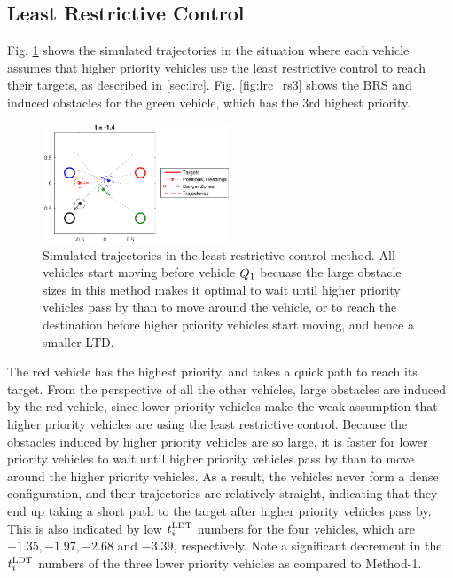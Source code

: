 \subsection{Least Restrictive Control}
Fig. \ref{fig:lrc_traj} shows the simulated trajectories in the situation where each vehicle assumes that higher priority vehicles use the least restrictive control to reach their targets, as described in \ref{sec:lrc}. Fig. \ref{fig:lrc_rs3} shows the BRS and induced obstacles for the green vehicle, which has the 3rd highest priority.

\begin{figure}
  \centering
  \includegraphics[width=0.5\textwidth]{"fig/lrc_traj"}
  \caption{Simulated trajectories in the least restrictive control method. All vehicles start moving before vehicle $Q_1$ becuase the large obstacle sizes in this method makes it optimal to wait until higher priority vehicles pass by than to move around the vehicle, or to reach the destination before higher priority vehicles start moving, and hence a smaller LTD. }
  \label{fig:lrc_traj}
\end{figure}

The red vehicle has the highest priority, and takes a quick path to reach its target. From the perspective of all the other vehicles, large obstacles are induced by the red vehicle, since lower priority vehicles make the weak assumption that higher priority vehicles are using the least restrictive control. Because the obstacles induced by higher priority vehicles are so large, it is faster for lower priority vehicles to wait until higher priority vehicles pass by than to move around the higher priority vehicles. As a result, the vehicles never form a dense configuration, and their trajectories are relatively straight, indicating that they end up taking a short path to the target after higher priority vehicles pass by. This is also indicated by low $t^\text{LDT}_i$ numbers for the four vehicles, which are $-1.35, -1.97, -2.68$ and $-3.39$, respectively. Note a significant decrement in the $t^\text{LDT}_i$ numbers of the three lower priority vehicles as compared to Method-1.

